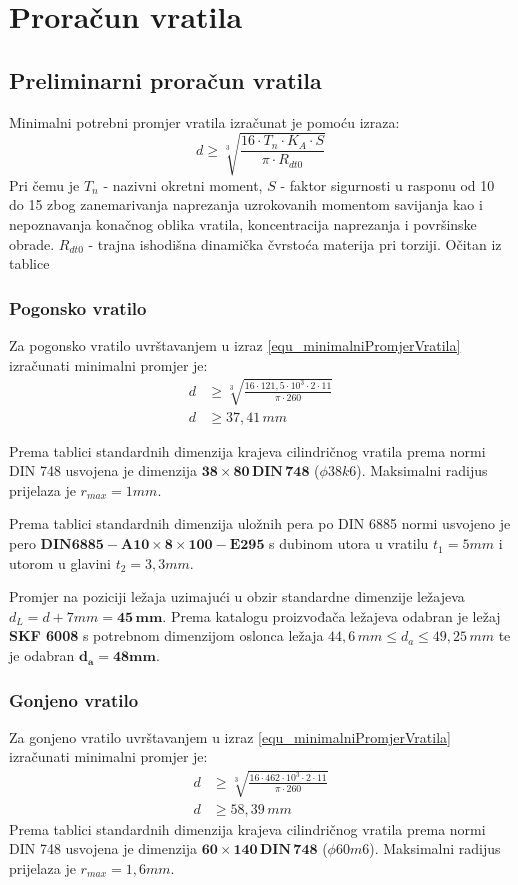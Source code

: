 \documentclass[11pt,a4paper]{report}
\begin{document}
\section{Proračun vratila}
\subsection{Preliminarni proračun vratila}
Minimalni potrebni promjer vratila izračunat je pomoću izraza:
\begin{equation}
d\geq \sqrt[3]{\frac{16 \cdot T_n \cdot K_A \cdot S}{\pi \cdot R_{dt0}}}\label{equ_minimalniPromjerVratila}
\end{equation}
Pri čemu je $T_n$ - nazivni okretni moment,
$S$ - faktor sigurnosti u rasponu od 10 do 15 zbog zanemarivanja naprezanja uzrokovanih momentom savijanja kao i nepoznavanja konačnog oblika vratila, koncentracija naprezanja i površinske obrade.
$R_{dt0}$ - trajna ishodišna dinamička čvrstoća materija pri torziji. Očitan iz tablice \cite{krivzan1998osnove}

\subsubsection{Pogonsko vratilo}
Za pogonsko vratilo uvrštavanjem u izraz \eqref{equ_minimalniPromjerVratila} izračunati minimalni promjer je:
\begin{align*}
d&\geq \sqrt[3]{\frac{16 \cdot 121,5 \cdot 10^3 \cdot 2 \cdot 11}{\pi \cdot 260}}\\
d&\geq 37,41 \,mm
\end{align*}

Prema tablici\cite{potrebniMaterijali} standardnih dimenzija krajeva cilindričnog vratila prema normi DIN 748 usvojena je dimenzija $\mathbf{38 \times 80 \,DIN \,748}$ ($\phi38k6$).
Maksimalni radijus prijelaza je $r_{max}=1 mm$.

Prema tablici standardnih dimenzija uložnih pera\cite{potrebniMaterijali} po DIN 6885 normi usvojeno je pero $\mathbf{DIN6885-A 10 \times 8 \times 100-E295}$ s dubinom utora u vratilu $t_1=5mm$ i utorom u glavini $t_2=3,3mm$.

Promjer na poziciji ležaja uzimajući u obzir standardne dimenzije ležajeva $d_L=d+7mm= \mathbf{45 \,mm}$.
Prema katalogu proizvođača ležajeva\cite{skf} odabran je ležaj \textbf{SKF 6008} s potrebnom dimenzijom oslonca ležaja $44,6 \, mm \leq d_a \leq 49,25 \, mm$ te je odabran $\mathbf{d_a=48mm}$.

\subsubsection{Gonjeno vratilo}
Za gonjeno vratilo uvrštavanjem u izraz \eqref{equ_minimalniPromjerVratila} izračunati minimalni promjer je:
\begin{align*}
d&\geq \sqrt[3]{\frac{16 \cdot 462 \cdot 10^3 \cdot 2 \cdot 11}{\pi \cdot 260}}\\
d&\geq 58,39 \,mm
\end{align*}
Prema tablici\cite{potrebniMaterijali} standardnih dimenzija krajeva cilindričnog vratila prema normi DIN 748 usvojena je dimenzija $\mathbf{60 \times 140 \,DIN \, 748}$ ($\phi60m6$).
Maksimalni radijus prijelaza je $r_{max}=1,6 mm$.
\end{document}
